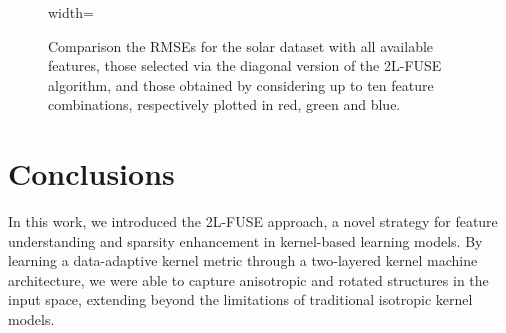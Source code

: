 \documentclass[hyphens,a4paper,11pt]{article}
\begin{document}
\begin{figure}[htbp]
\begin{adjustbox}{width=\textwidth}
\end{adjustbox}
\caption{Comparison the RMSEs for the solar dataset with  all available features, those selected via
the diagonal version of the 2L-FUSE algorithm, and those obtained by considering up to ten feature
combinations, respectively plotted in red, green and blue.
}
\label{fig:solar}
\end{figure}

\section{Conclusions}
\label{conclusions}

In this work, we introduced the 2L-FUSE approach, a novel strategy for feature understanding and sparsity enhancement in kernel-based learning models. By learning a data-adaptive kernel metric through a two-layered kernel machine architecture, we were able to capture anisotropic and rotated structures in the input space, extending beyond the limitations of traditional isotropic kernel models.
\end{document}
